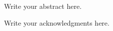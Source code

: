 \documentclass[11pt, oneside]{Emory-special-pages}
\title{} %
\author{} %
\date{\today}                                           %
\begin{document}
\makedistribution
\makeapproval
\makeabstracttitle
\makeabstract
\singlespacing
Write your abstract here.
\clearpage
\maketitle
\makeacknowledgements
\singlespacing
Write your acknowledgments here.
\end{document}
